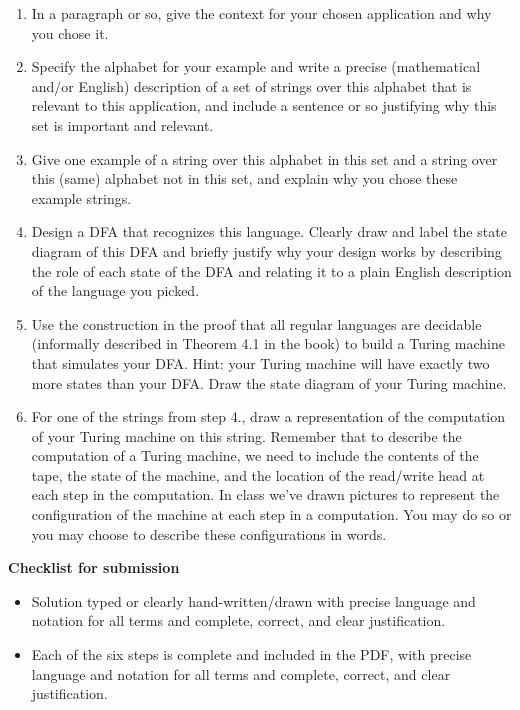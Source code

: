 \documentclass[12pt, oneside]{article}
\begin{document}
\begin{enumerate}
   \item In a paragraph or so, give the context for your chosen application and why you chose it.
   \item Specify the alphabet for your example and write a precise (mathematical and/or English) description of a set of strings over 
   this alphabet that is relevant to this application, and include a sentence or so justifying why this set is 
   important and relevant.
   \item Give one example of a string over this alphabet in this set and a string 
   over this (same) alphabet not in this set, and explain why you 
   chose these example strings.
   \item Design a DFA that recognizes this language. Clearly draw and label the state diagram 
   of this DFA and briefly justify why your design works by describing the role of each state of the DFA and 
   relating it to a plain English description of the language you picked.
   \item Use the construction in the proof that all regular languages are decidable
   (informally described in Theorem 4.1 in the book) to build a Turing machine
   that simulates your DFA. Hint: your Turing machine will have exactly two more states than your DFA.
   Draw the state diagram of your Turing machine.
   \item For one of the strings from step 4., draw a representation of the computation of your 
   Turing machine on this string.
   Remember that to describe the computation of a Turing machine, we need to include the contents of the 
   tape, the state of the machine, and the location of the read/write head at each step in the computation.
   In class we've drawn pictures to represent the configuration of the machine at each step 
   in a computation.  You may do so or you may choose to describe these configurations in words.
\end{enumerate}
{\bf Checklist for submission}
\begin{itemize}
   \item Solution typed or clearly hand-written/drawn with precise language and notation for all terms and complete, correct, and clear justification.
   \item Each of the six steps is complete and included in the PDF, with precise language and notation for all
    terms and complete, correct, and clear justification.

\end{itemize}
\end{document}
